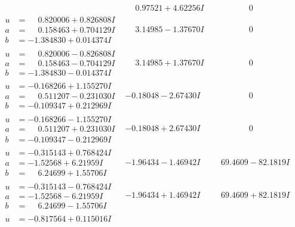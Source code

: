 \documentclass[1p]{elsarticle_modified}
\theoremstyle{definition}
\begin{document}
$$\begin{array}{c|c|c}
 & \phantom{-}0.97521 + 4.62256 I & \phantom{-0.000000 } 0 \\ \hline\begin{aligned}
u &= \phantom{-}0.820006 + 0.826808 I \\
a &= \phantom{-}0.158463 + 0.704129 I \\
b &= -1.384830 + 0.014374 I\end{aligned}
 & \phantom{-}3.14985 - 1.37670 I & \phantom{-0.000000 } 0 \\ \hline\begin{aligned}
u &= \phantom{-}0.820006 - 0.826808 I \\
a &= \phantom{-}0.158463 - 0.704129 I \\
b &= -1.384830 - 0.014374 I\end{aligned}
 & \phantom{-}3.14985 + 1.37670 I & \phantom{-0.000000 } 0 \\ \hline\begin{aligned}
u &= -0.168266 + 1.155270 I \\
a &= \phantom{-}0.511207 - 0.231030 I \\
b &= -0.109347 + 0.212969 I\end{aligned}
 & -0.18048 - 2.67430 I & \phantom{-0.000000 } 0 \\ \hline\begin{aligned}
u &= -0.168266 - 1.155270 I \\
a &= \phantom{-}0.511207 + 0.231030 I \\
b &= -0.109347 - 0.212969 I\end{aligned}
 & -0.18048 + 2.67430 I & \phantom{-0.000000 } 0 \\ \hline\begin{aligned}
u &= -0.315143 + 0.768424 I \\
a &= -1.52568 + 6.21959 I \\
b &= \phantom{-}6.24699 + 1.55706 I\end{aligned}
 & -1.96434 - 1.46942 I & \phantom{-}69.4609 - 82.1819 I \\ \hline\begin{aligned}
u &= -0.315143 - 0.768424 I \\
a &= -1.52568 - 6.21959 I \\
b &= \phantom{-}6.24699 - 1.55706 I\end{aligned}
 & -1.96434 + 1.46942 I & \phantom{-}69.4609 + 82.1819 I \\ \hline\begin{aligned}
u &= -0.817564 + 0.115016 I \\

\end{aligned}
\end{array}$$
\end{document}
